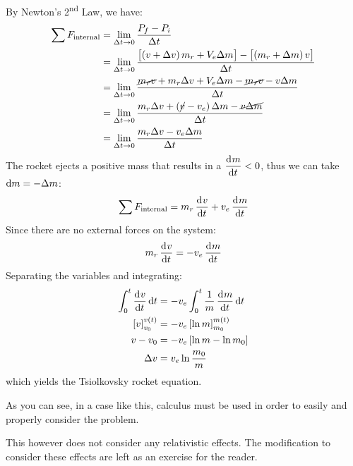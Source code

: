 \documentclass[answers]{exam}
\begin{document}
\begin{questions}
{\begin{solution}
			By Newton's 2\textsuperscript{nd} Law, we have:
			\begin{align*}
				\sum F_\text{internal} &= \lim_{\Delta t \to 0} \frac{P_f - P_i}{\Delta t} \\
				& = \lim_{\Delta t \to 0}\frac{\left[\left(v + \Delta v\right)m_r + V_e \Delta m\right] - \left[\left(m_r + \Delta m\right)v\right]}{\Delta t} \\
				& = \lim_{\Delta t \to 0}\frac{\cancel{m_rv} + m_r\Delta v + V_e \Delta m - \cancel{m_rv} - v\Delta m}{\Delta t} \\
				& = \lim_{\Delta t \to 0}\frac{m_r\Delta v + \left(\cancel{v} - v_e\right) \Delta m - \cancel{v\Delta m}}{\Delta t} \\
				& = \lim_{\Delta t \to 0}\frac{m_r\Delta v - v_e\Delta m}{\Delta t} 
			\end{align*}
			The rocket ejects a positive mass that results in a $\dod{m}{t} < 0$, thus we can take $\dif{m} = -\Delta m$:
			\begin{equation}
				\sum F_\text{internal} = m_r \dod{v}{t} + v_e \dod{m}{t}
			\end{equation}
			Since there are no external forces on the system:
			\begin{equation}
				m_r \dod{v}{t} = -v_e \dod{m}{t}
			\end{equation}
			Separating the variables and integrating:
			\begin{align*}
				\int_0^t \dod{v}{t} \dif t &= - v_e \int_0^t \frac{1}{m} \dod{m}{t} \dif{t} \\ 
				\left[v\right]^{v\left(t\right)}_{v_0} &= -v_e\left[\ln{m}\right]^{m\left(t\right)}_{m_0} \\
				v - v_0 &= -v_e\left[\ln m - \ln m_0\right] \\
				\Delta v &= v_e\ln{\frac{m_0}{m}}
			\end{align*}
			which yields the Tsiolkovsky rocket equation.

			As you can see, in a case like this, calculus must be used in order to easily and properly consider the problem.

			This however does not consider any relativistic effects. The modification to consider these effects are left as an exercise for the reader. 
		\end{solution}
	}
\end{questions}
\ifprintanswers
	\pagebreak
\fi
\end{document}

